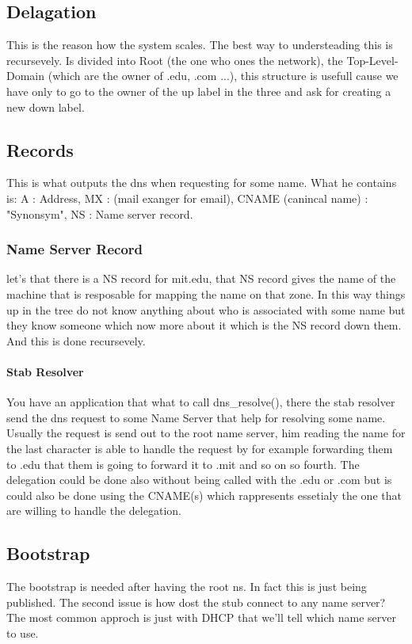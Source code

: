 \documentclass{article}
\begin{document}
    \subsection{Delagation}
      This is the reason how the system scales. The best way to understeading this is 
      recursevely. Is divided into Root (the one who ones the network), the Top-Level-Domain
      (which are the owner of .edu, .com ...), this structure is usefull cause we have only
      to go to the owner of the up label in the three and ask for creating a new down label. 
    \subsection{Records}
      This is what outputs the dns when requesting for some name. What he contains is:
      A : Address, MX : (mail exanger for email), CNAME (canincal name) : "Synonsym", NS :
      Name server record.
      \subsubsection{Name Server Record}
        let's that there is a NS record for mit.edu, that NS record gives the name of 
        the machine that is resposable for mapping the name on that zone. In this way 
        things up in the tree do not know anything about who is associated with some name
        but they know someone which now more about it which is the NS record down them. And 
        this is done recursevely.
        \paragraph{Stab Resolver} You have an application that what to call dns\_resolve(), 
        there the stab resolver send the dns request to some Name Server that help for 
        resolving some name. Usually the request is send out to the root name server, him 
        reading the name for the last character is able to handle the request by for 
        example forwarding them to .edu that them is going to forward it to .mit and so on so
        fourth. The delegation could be done also without being called with the .edu or .com
        but is could also be done using the CNAME(s) which rappresents essetialy the one
        that are willing to handle the delegation.
    \subsection{Bootstrap}
      The bootstrap is needed after having the root ns. In fact this is just being published. 
      The second issue is how dost the stub connect to any name server? The most common
      approch is just with DHCP that we'll tell which name server to use.
\end{document}
